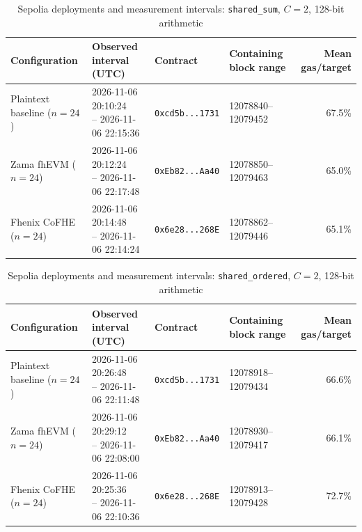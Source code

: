 \begin{table}[!t]
\caption{Sepolia deployments and measurement intervals: \texttt{shared\_sum}, \(C=2\), 128-bit arithmetic}
\label{tab:sepolia-experiment-deployments-concurrency-euint128-concurrency-w128-c2-shared-sum}
\centering
\footnotesize
\setlength{\tabcolsep}{4pt}
\begin{tabular}{|l|l|l|l|r|}
\hline
\textbf{Configuration} &
\textbf{Observed interval (UTC)} &
\textbf{Contract} &
\textbf{Containing block range} &
\textbf{Mean gas/target} \\
\hline
Plaintext baseline (\(n=24\)) &
\shortstack[l]{2026-11-06 20:10:24 \\ -- 2026-11-06 22:15:36} &
\texttt{0xcd5b...1731} &
12078840--12079452 &
67.5\% \\
\hline
Zama fhEVM (\(n=24\)) &
\shortstack[l]{2026-11-06 20:12:24 \\ -- 2026-11-06 22:17:48} &
\texttt{0xEb82...Aa40} &
12078850--12079463 &
65.0\% \\
\hline
Fhenix CoFHE (\(n=24\)) &
\shortstack[l]{2026-11-06 20:14:48 \\ -- 2026-11-06 22:14:24} &
\texttt{0x6e28...268E} &
12078862--12079446 &
65.1\% \\
\hline
\end{tabular}
\end{table}

\begin{table}[!t]
\caption{Sepolia deployments and measurement intervals: \texttt{shared\_ordered}, \(C=2\), 128-bit arithmetic}
\label{tab:sepolia-experiment-deployments-concurrency-euint128-concurrency-w128-c2-shared-ordered}
\centering
\footnotesize
\setlength{\tabcolsep}{4pt}
\begin{tabular}{|l|l|l|l|r|}
\hline
\textbf{Configuration} &
\textbf{Observed interval (UTC)} &
\textbf{Contract} &
\textbf{Containing block range} &
\textbf{Mean gas/target} \\
\hline
Plaintext baseline (\(n=24\)) &
\shortstack[l]{2026-11-06 20:26:48 \\ -- 2026-11-06 22:11:48} &
\texttt{0xcd5b...1731} &
12078918--12079434 &
66.6\% \\
\hline
Zama fhEVM (\(n=24\)) &
\shortstack[l]{2026-11-06 20:29:12 \\ -- 2026-11-06 22:08:00} &
\texttt{0xEb82...Aa40} &
12078930--12079417 &
66.1\% \\
\hline
Fhenix CoFHE (\(n=24\)) &
\shortstack[l]{2026-11-06 20:25:36 \\ -- 2026-11-06 22:10:36} &
\texttt{0x6e28...268E} &
12078913--12079428 &
72.7\% \\
\hline
\end{tabular}
\end{table}
